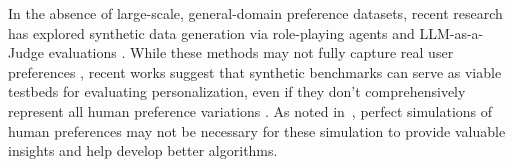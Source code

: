In the absence of large-scale, general-domain preference datasets, recent research has explored synthetic data generation via role-playing agents and LLM-as-a-Judge evaluations \cite{zheng_judging_2023, jang_personalized_2023, zollo_personalllm_2024, castricato_persona_2024, shao_character-llm_2023, liu2024aligningb}. While these methods may not fully capture real user preferences \cite{hu_quantifying_2024}, recent works suggest that synthetic benchmarks can serve as viable testbeds for evaluating personalization, even if they don't comprehensively represent all human preference variations \cite{castricato_persona_2024, zollo_personalllm_2024}. As noted in~\citet{balog2025user}, perfect simulations of human preferences may not be necessary for these simulation to provide valuable insights and help develop better algorithms.


